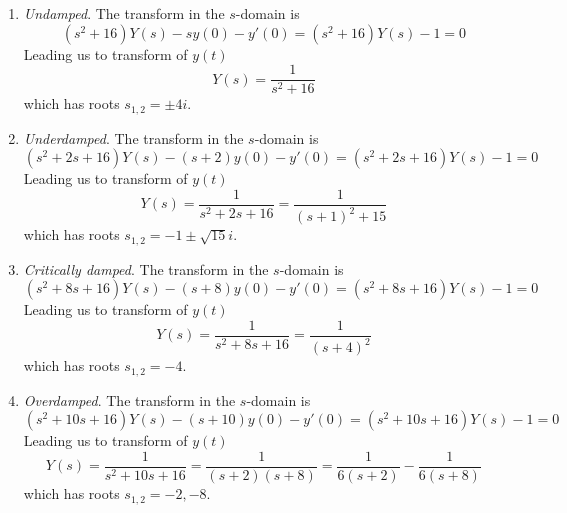 \documentclass[a4paper]{article}
\begin{document}
\begin{enumerate}[label=\arabic*.]
	\item \textit{Undamped}. The transform in the \( s  \)-domain is
	\[
		\!\left( s^{2} + 16 \right)Y \!\left( s \right) - sy \!\left( 0 \right) - y'\!\left( 0 \right) = \!\left( s^{2} + 16 \right)Y \!\left( s  \right) - 1 = 0 
	\]
	Leading us to transform of \( y \!\left( t  \right) \)
	\[
		Y \!\left( s  \right) = \frac{1}{s^{2} + 16} 
	\]
	which has roots \( s_{1,2} = \pm 4i \).
	\item \textit{Underdamped}. The transform in the \( s  \)-domain is
	\[
		\!\left( s^{2} + 2s + 16 \right)Y \!\left( s  \right) - \!\left( s + 2 \right)y \!\left( 0 \right) - y'\!\left( 0 \right) = \!\left( s^{2} + 2s + 16 \right)Y \!\left( s  \right) - 1 = 0
	\]
	Leading us to transform of \( y \!\left( t  \right) \)
	\[
		Y \!\left( s  \right) = \frac{1}{s^{2} + 2s + 16} = \frac{1}{\!\left( s + 1 \right)^{2} + 15}
	\]
	which has roots \( s_{1,2} = -1 \pm \sqrt{15} i \).
	\item \textit{Critically damped}. The transform in the \( s  \)-domain is
	\[
		\!\left( s^{2} + 8s + 16 \right)Y \!\left( s  \right) - \!\left( s + 8 \right)y \!\left( 0 \right) - y'\!\left( 0 \right) = \!\left( s^{2} + 8s + 16 \right)Y \!\left( s  \right) - 1 = 0 
	\]
	Leading us to transform of \( y \!\left( t  \right) \)
	\[
		Y \!\left( s  \right) = \frac{1}{s^{2} + 8s + 16} = \frac{1}{\!\left( s + 4 \right)^{2}}
	\]
	which has roots \( s_{1,2} = -4 \).
	\item \textit{Overdamped}. The transform in the \( s  \)-domain is
	\[
		\!\left( s^{2} + 10s + 16 \right)Y \!\left( s  \right) - \!\left( s + 10 \right)y \!\left( 0 \right) - y'\!\left( 0 \right) = \!\left( s^{2} + 10s + 16 \right)Y \!\left( s  \right) - 1 = 0
	\]
	Leading us to transform of \( y \!\left( t  \right) \)
	\[
		Y \!\left( s  \right) = \frac{1}{s^{2} + 10s + 16} = \frac{1}{\!\left( s + 2 \right)\!\left( s + 8 \right)} = \frac{1}{6 \!\left( s + 2 \right)} - \frac{1}{6 \!\left( s + 8 \right)}
	\]
	which has roots \( s_{1,2} = -2, -8 \).
\end{enumerate}

\end{document}
